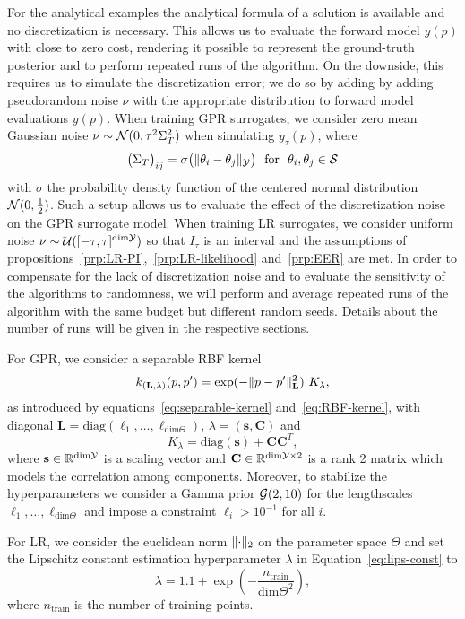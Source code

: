 For the analytical examples the analytical formula of a solution is available and no discretization is necessary.
This allows us to evaluate the forward model $y(p)$ with close to zero cost, rendering it possible to represent the ground-truth posterior and to perform repeated runs of the algorithm. 
On the downside, this requires us to simulate the discretization error; we do so by adding by adding pseudorandom noise $\nu$ with the appropriate distribution to forward model evaluations $y(p)$. \newline
When training GPR surrogates, we consider zero mean Gaussian noise $\nu \sim \mathcal N (0, \tau^2 \Sigma_T^2)$ when simulating $y_\tau(p)$, where \[
\big(\Sigma_T\big)_{ij} = \sigma\big( \|\theta_i - \theta_j\|_{\mathcal Y} \big) \ \text{ for } \ \theta_i, \theta_j \in \mathcal S
\]
with $\sigma$ the probability density function of the centered normal distribution $\mathcal N(0, \frac{1}{2})$.
Such a setup allows us to evaluate the effect of the discretization noise on the GPR surrogate model.\newline
When training LR surrogates, we consider uniform noise $\nu \sim \mathcal U([-\tau, \tau]^{\text{dim} \mathcal Y})$ so that $I_\tau$ is an interval and the assumptions of propositions~\ref{prp:LR-PI},~\ref{prp:LR-likelihood} and~\ref{prp:EER} are met. \newline
In order to compensate for the lack of discretization noise and to evaluate the sensitivity of the algorithms to randomness, we will perform and average repeated runs of the algorithm with the same budget but different random seeds.
Details about the number of runs will be given in the respective sections. \medskip

For GPR, we consider a separable RBF kernel 
\[
    k_{(\mathbf{L}, \lambda)}(p, p') =  \exp ( - \lVert p - p'\rVert^2_{\mathbf{L}} ) \ K_\lambda,
\]
as introduced by equations~\eqref{eq:separable-kernel} and~\eqref{eq:RBF-kernel}, with diagonal $\mathbf{L} = \text{diag}(\ell_1, \dots, \ell_{\text{dim} \Theta})$, $\lambda = (\mathbf{s}, \mathbf{C}) $ and
\[
K_\lambda = \text{diag}(\mathbf{s}) + \mathbf{CC}^T,
\] 
where $\mathbf{s} \in \mathbb{R}^{\text{dim} \mathcal Y}$ is a scaling vector and $\mathbf{C} \in \mathbb{R}^{\text{dim} \mathcal Y \times 2}$ is a rank 2 matrix which models the correlation among components. 
Moreover, to stabilize the hyperparameters we consider a Gamma prior $\mathcal G(2, 10)$ for the lengthscales $\ell_1, \dots, \ell_{\text{dim} \Theta}$ and impose a constraint $\ell_i > 10^{-1}$ for all $i$.

For LR, we consider the euclidean norm $\lVert\cdot\rVert_2$ on the parameter space $\Theta$ and set the Lipschitz constant estimation hyperparameter $\lambda$ in Equation~\eqref{eq:lips-const} to 
\[ \lambda = 1.1 + \exp{\left(-\frac{n_\text{train}}{\text{dim} \Theta^2}\right)},\] where $n_\text{train}$ is the number of training points.
\medskip

